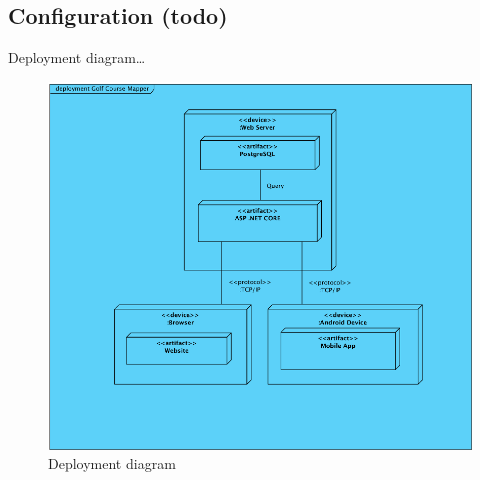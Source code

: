 \documentclass{article}
\begin{document}
    \subsection{Configuration (todo)}

    Deployment diagram\ldots

    \begin{center}
        \begin{figure}[h]
            \centering
            \includegraphics[scale=0.9]{DeploymentDiagram}
            \caption{Deployment diagram}
            \label{deploymentdiagram}
        \end{figure}
    \end{center}
\end{document}
